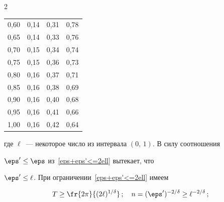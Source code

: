 \begin{multicols}{2}
{\begin{center}
\begin{tabular}{|c|c|c|c|}
 0,60 & 0,14 & 0,31 & 0,78 \\


 0,65 & 0,14 & 0,33 & 0,76 \\


 0,70 & 0,15 & 0,34 & 0,74 \\


 0,75 & 0,15 & 0,36 & 0,73 \\


 0,80 & 0,16 & 0,37 & 0,71 \\


 0,85 & 0,16 & 0,38 & 0,69 \\


 0,90 & 0,16 & 0,40 & 0,68 \\


 0,95 & 0,16 & 0,41 & 0,66 \\


 1,00 & 0,16 & 0,42 & 0,64 \\


\hline


\end{tabular}


\end{center}


}




\vspace*{2pt}








\bigskip


\addtocounter{table}{1}








\noindent


где $\ell$~--- некоторое число из интервала $(0,\,1)$. В силу соотношения


$\eps'\le\eps$ из~\eqref{eps+eps'<=2ell} вытекает, что


$\eps'\le\ell$. При ограничении~\eqref{eps+eps'<=2ell} имеем





\noindent


\begin{gather*}


T\ge \fr{2\pi}{(2\ell)^{1/\delta}}\,;\quad n=(\eps')^{-2/\delta}\ge


\ell^{-2/\delta}\,;\\



\end{gather*}
\end{multicols}
